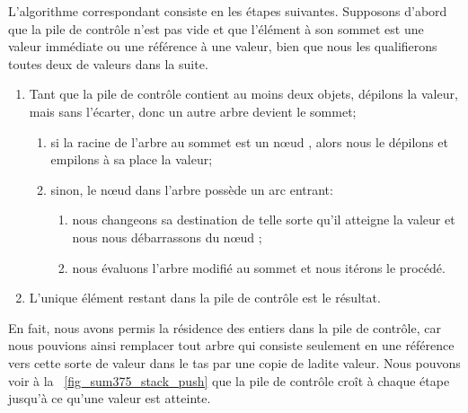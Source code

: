 L'algorithme correspondant consiste en les étapes suivantes. Supposons
d'abord que la pile de contrôle n'est pas vide et que l'élément à son
sommet est une valeur immédiate ou une référence à une valeur, bien
que nous les qualifierons toutes deux de valeurs dans la suite.
\begin{enumerate}

  \item Tant que la pile de contrôle contient au moins deux objets,
    dépilons la valeur, mais sans l'écarter, donc un autre arbre
    devient le sommet;
    \begin{enumerate}
      
    \item si la racine de l'arbre au sommet est un n{\oe}ud ,
      alors nous le dépilons et empilons à sa place la valeur;
      
    \item sinon, le n{\oe}ud  dans l'arbre possède un arc
      entrant:
      \begin{enumerate}
        
      \item nous changeons sa destination de telle sorte qu'il
        atteigne la valeur et nous nous débarrassons du n{\oe}ud
        ;
        
      \item nous évaluons l'arbre modifié au sommet et nous itérons le
        procédé.
        
      \end{enumerate}
      
    \end{enumerate}
    
  \item L'unique élément restant dans la pile de contrôle est le résultat.
    
\end{enumerate}
En fait, nous avons permis la résidence des entiers dans la pile de
contrôle, car nous pouvions ainsi remplacer tout arbre qui consiste
seulement en une référence vers cette sorte de valeur dans le tas par
une copie de ladite valeur. Nous pouvons voir à la
\fig~\ref{fig_sum375_stack_push} que la pile de contrôle croît à
chaque étape jusqu'à ce qu'une valeur est atteinte.
 


